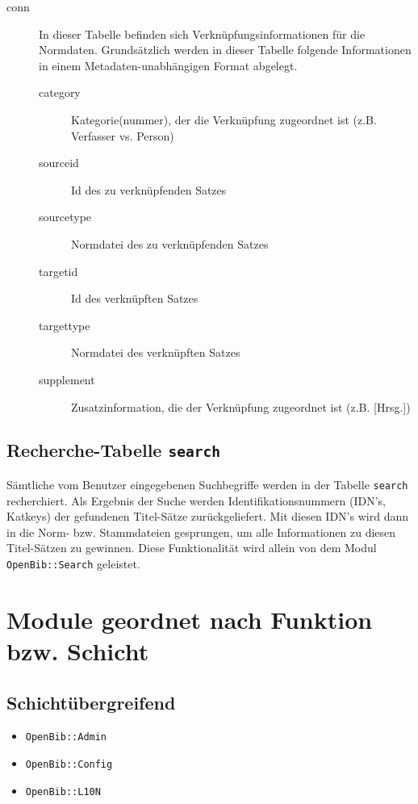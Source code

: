 \documentclass[11pt, twoside, a4paper, BCOR8mm, DIV12, bibtotoc,idxtotoc]{scrbook}
\begin{document}
\begin{description}
\item[conn] In dieser Tabelle befinden sich
  Verknüpfungsinformationen für die Normdaten. 
  Grundsätzlich werden in dieser Tabelle folgende Informationen in
  einem Metadaten-unabhängigen Format abgelegt.
  \begin{description}
  \item[category] Kategorie(nummer), der die Verknüpfung zugeordnet
    ist (z.B. Verfasser vs. Person)
  \item[sourceid] Id des zu verknüpfenden Satzes
  \item[sourcetype] Normdatei des zu verknüpfenden Satzes
  \item[targetid] Id des verknüpften Satzes
  \item[targettype] Normdatei des verknüpften Satzes
  \item[supplement] Zusatzinformation, die der Verknüpfung zugeordnet
    ist (z.B. [Hrsg.])
  \end{description}
\end{description}


\section{Recherche-Tabelle \texttt{search}}

Sämtliche vom Benutzer eingegebenen Suchbegriffe werden in der Tabelle
\texttt{search} recherchiert. Als Ergebnis der Suche werden
Identifikationsnummern (IDN's, Katkeys) der gefundenen Titel-Sätze
zurückgeliefert. Mit diesen IDN's wird dann in die Norm- bzw.
Stammdateien gesprungen, um alle Informationen zu diesen Titel-Sätzen
zu gewinnen. Diese Funktionalität wird allein von dem Modul
\texttt{OpenBib::Search} geleistet.

\chapter{Module geordnet nach Funktion bzw. Schicht}


\section{Schichtübergreifend}


\begin{itemize}
\item \texttt{OpenBib::Admin}
\item \texttt{OpenBib::Config}
\item \texttt{OpenBib::L10N}
\end{itemize}
\end{document}
